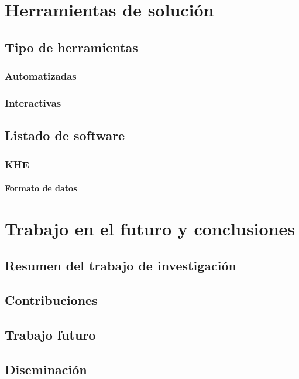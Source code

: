 \documentclass[draft,12pt,headsepline,footsepline,paper=letter]{scrreprt}
\begin{document}
\chapter{Herramientas de solución}

\section{Tipo de herramientas}

\subsection{Automatizadas}

\subsection{Interactivas}

\section{Listado de software}

\subsection{KHE}

\subsubsection{Formato de datos}

\chapter{Trabajo en el futuro y conclusiones}

\section{Resumen del trabajo de investigación}

\section{Contribuciones}

\section{Trabajo futuro}

\section{Diseminación}
\end{document}
